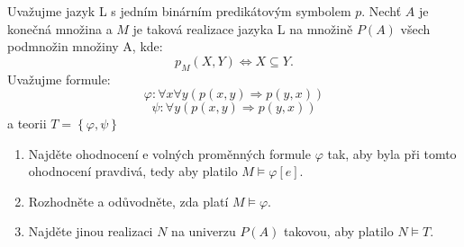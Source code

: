 \subsubsection{}
Uvažujme jazyk L s jedním binárním predikátovým symbolem $p$. Nechť $A$ je
konečná množina a $M$ je taková realizace jazyka L na množině $P(A)$ všech
podmnožin množiny A, kde:
$$p_{M}(X,Y) \Leftrightarrow X\subseteq Y.$$
Uvažujme formule:
$$\varphi: \forall x \forall y (p(x,y) \Rightarrow p(y,x))$$
$$\psi: \forall y (p(x,y) \Rightarrow p(y,x))$$
a teorii $T=\left \{ \varphi, \psi \right \}$
\begin{enumerate}[(1)]
  \item Najděte ohodnocení e volných proměnných formule $\varphi$ tak, aby byla
  při tomto ohodnocení pravdivá, tedy aby platilo $M\models \varphi[e]$.
  \item Rozhodněte a odůvodněte, zda platí $M\models \varphi$.
  \item Najděte jinou realizaci $N$ na univerzu $P(A)$ takovou, aby platilo $N
  \models T$.
\end{enumerate}

